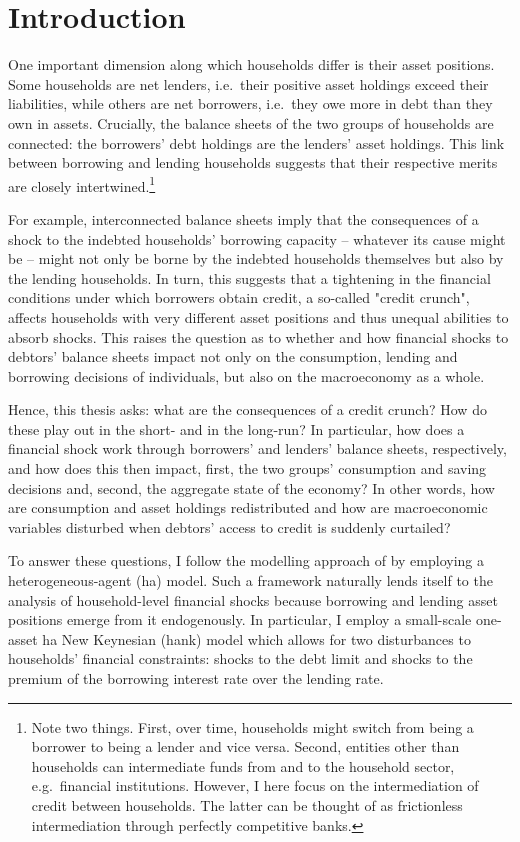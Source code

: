 \documentclass[12pt]{article} %
\numberwithin{equation}{section} %
\numberwithin{figure}{section}
\numberwithin{table}{section}
\begin{document}
\section{Introduction}
\label{sec:introduction}

One important dimension along which households differ is their asset positions. Some households are net lenders, i.e.~their positive asset holdings exceed their liabilities, while others are net borrowers, i.e.~they owe more in debt than they own in assets. Crucially, the balance sheets of the two groups of households are connected: the borrowers' debt holdings are the lenders' asset holdings. This link between borrowing and lending households suggests that their respective merits are closely intertwined.\footnote{Note two things. First, over time, households might switch from being a borrower to being a lender and vice versa. Second, entities other than households can intermediate funds from and to the household sector, e.g.~financial institutions. However, I here focus on the intermediation of credit between households. The latter can be thought of as frictionless intermediation through perfectly competitive banks.} 

For example, interconnected balance sheets imply that the consequences of a shock to the indebted households' borrowing capacity -- whatever its cause might be -- might not only be borne by the indebted households themselves but also by the lending households. In turn, this suggests that a tightening in the financial conditions under which borrowers obtain credit, a so-called "credit crunch", affects households with very different asset positions and thus unequal abilities to absorb shocks. This raises the question as to whether and how financial shocks to debtors' balance sheets impact not only on the consumption, lending and borrowing decisions of individuals, but also on the macroeconomy as a whole. 

Hence, this thesis asks: what are the consequences of a credit crunch? How do these play out in the short- and in the long-run? In particular, how does a financial shock work through borrowers' and lenders' balance sheets, respectively, and how does this then impact, first, the two groups' consumption and saving decisions and, second, the aggregate state of the economy? In other words, how are consumption and asset holdings redistributed and how are macroeconomic variables disturbed when debtors' access to credit is suddenly curtailed?

To answer these questions, I follow the modelling approach of \textcite{gl2017} by employing a heterogeneous-agent (\Gls{ha}) model. Such a framework naturally lends itself to the analysis of household-level financial shocks because borrowing and lending asset positions emerge from it endogenously. In particular, I employ a small-scale one-asset \Gls{ha} New Keynesian (\Gls{hank}) model which allows for two disturbances to households' financial constraints: shocks to the debt limit and shocks to the premium of the borrowing interest rate over the lending rate.
\end{document}

